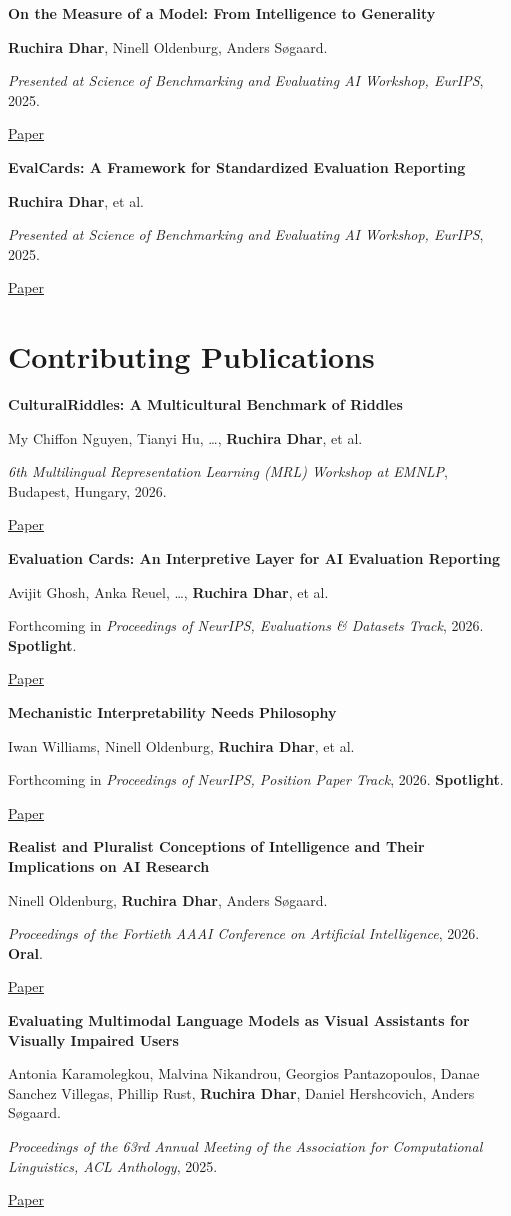 \documentclass[11pt,letterpaper]{article}
\newcommand{\publication}[4]{%
  \par\addvspace{7pt}\Needspace{6\baselineskip}%
  \begin{samepage}%
    \setlength{\parskip}{1.5pt}%
    \noindent\textbf{#1}\par\nobreak
    {\small #2\par}\nobreak
    {\small\color{muted}#3\par}\nobreak
    {\footnotesize\sffamily #4\par}%
  \end{samepage}%
}
\begin{document}
\publication
  {On the Measure of a Model: From Intelligence to Generality}
  {\textbf{Ruchira Dhar}, Ninell Oldenburg, Anders S\o{}gaard.}
  {\textit{Presented at Science of Benchmarking and Evaluating AI Workshop, EurIPS}, 2025.}
  {\href{https://arxiv.org/abs/2511.11773}{Paper}}

\publication
  {EvalCards: A Framework for Standardized Evaluation Reporting}
  {\textbf{Ruchira Dhar}, et al.}
  {\textit{Presented at Science of Benchmarking and Evaluating AI Workshop, EurIPS}, 2025.}
  {\href{https://arxiv.org/abs/2511.21695}{Paper}}


\section{Contributing Publications}

\publication
  {CulturalRiddles: A Multicultural Benchmark of Riddles}
  {My Chiffon Nguyen, Tianyi Hu, \ldots, \textbf{Ruchira Dhar}, et al.}
  {\textit{6th Multilingual Representation Learning (MRL) Workshop at EMNLP}, Budapest, Hungary, 2026.}
  {\href{https://arxiv.org/abs/2610.29968}{Paper}}

\publication
  {Evaluation Cards: An Interpretive Layer for AI Evaluation Reporting}
  {Avijit Ghosh, Anka Reuel, \ldots, \textbf{Ruchira Dhar}, et al.}
  {Forthcoming in \textit {Proceedings of NeurIPS, Evaluations \& Datasets Track}, 2026. \textbf{Spotlight}.}
  {\href{https://arxiv.org/abs/2606.09809}{Paper}}

\publication
  {Mechanistic Interpretability Needs Philosophy}
  {Iwan Williams, Ninell Oldenburg, \textbf{Ruchira Dhar}, et al.}
  {Forthcoming in \textit {Proceedings of NeurIPS, Position Paper Track}, 2026. \textbf{Spotlight}.}
  {\href{https://arxiv.org/abs/2506.18852}{Paper}}

\publication
  {Realist and Pluralist Conceptions of Intelligence and Their Implications on AI Research}
  {Ninell Oldenburg, \textbf{Ruchira Dhar}, Anders S\o{}gaard.}
  {\textit{Proceedings of the Fortieth AAAI Conference on Artificial Intelligence}, 2026. \textbf{Oral}.}
  {\href{https://arxiv.org/abs/2511.15282}{Paper}}

\publication
  {Evaluating Multimodal Language Models as Visual Assistants for Visually Impaired Users}
  {Antonia Karamolegkou, Malvina Nikandrou, Georgios Pantazopoulos, Danae Sanchez Villegas, Phillip Rust, \textbf{Ruchira Dhar}, Daniel Hershcovich, Anders S\o{}gaard.}
  {\textit{Proceedings of the 63rd Annual Meeting of the Association for Computational Linguistics, ACL Anthology}, 2025.}
  {\href{https://aclanthology.org/2025.acl-long.1260/}{Paper}}
\end{document}
